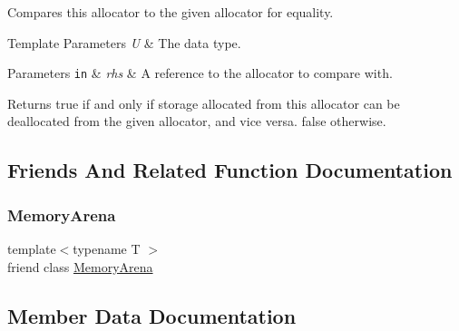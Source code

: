 Compares this allocator to the given allocator for equality.


\begin{DoxyTemplParams}{Template Parameters}
{\em U} & The data type. \\
\hline
\end{DoxyTemplParams}

\begin{DoxyParams}[1]{Parameters}
\mbox{\tt in}  & {\em rhs} & A reference to the allocator to compare with. \\
\hline
\end{DoxyParams}
\begin{DoxyReturn}{Returns}
{\ttfamily true} if and only if storage allocated from this allocator can be deallocated from the given allocator, and vice versa. {\ttfamily false} otherwise. 
\end{DoxyReturn}


\subsection{Friends And Related Function Documentation}
\mbox{\label{classmage_1_1_memory_arena_1_1_allocator_a934e79307a45b6e72da26d1f10079550}} 
\subsubsection{\texorpdfstring{Memory\+Arena}{MemoryArena}}
{\footnotesize\ttfamily template$<$typename T $>$ \\
friend class \mbox{\hyperlink{classmage_1_1_memory_arena}{Memory\+Arena}}\hspace{0.3cm}{\ttfamily [friend]}}



\subsection{Member Data Documentation}
\mbox{\label{classmage_1_1_memory_arena_1_1_allocator_a1243d2e182ee1001514cc0b50180b959}} 
